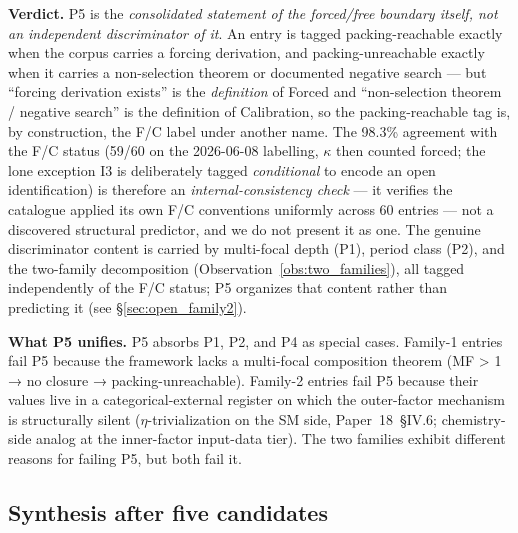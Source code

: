 \documentclass[11pt,a4paper]{article}
\theoremstyle{plain}
\theoremstyle{definition}
\begin{document}
\textbf{Verdict.}  P5 is the \emph{consolidated statement of the forced/free boundary itself, not an independent discriminator of it}. An entry is tagged packing-reachable exactly when the corpus carries a forcing derivation, and packing-unreachable exactly when it carries a non-selection theorem or documented negative search --- but ``forcing derivation exists'' is the \emph{definition} of Forced and ``non-selection theorem / negative search'' is the definition of Calibration, so the packing-reachable tag is, by construction, the F/C label under another name. The 98.3\% agreement with the F/C status (59/60 on the 2026-06-08 labelling, $\kappa$ then counted forced; the lone exception I3 is deliberately tagged \emph{conditional} to encode an open identification) is therefore an \emph{internal-consistency check} --- it verifies the catalogue applied its own F/C conventions uniformly across 60 entries --- not a discovered structural predictor, and we do not present it as one. The genuine discriminator content is carried by multi-focal depth (P1), period class (P2), and the two-family decomposition (Observation~\ref{obs:two_families}), all tagged independently of the F/C status; P5 organizes that content rather than predicting it (see \S\ref{sec:open_family2}).

\textbf{What P5 unifies.}  P5 absorbs P1, P2, and P4 as special cases.  Family-1 entries fail P5 because the framework lacks a multi-focal composition theorem (MF > 1 → no closure → packing-unreachable).  Family-2 entries fail P5 because their values live in a categorical-external register on which the outer-factor mechanism is structurally silent ($\eta$-trivialization on the SM side, Paper~18~\S IV.6; chemistry-side analog at the inner-factor input-data tier).  The two families exhibit different reasons for failing P5, but both fail it.

\subsection{Synthesis after five candidates}
\label{sec:p_synthesis}
\end{document}
